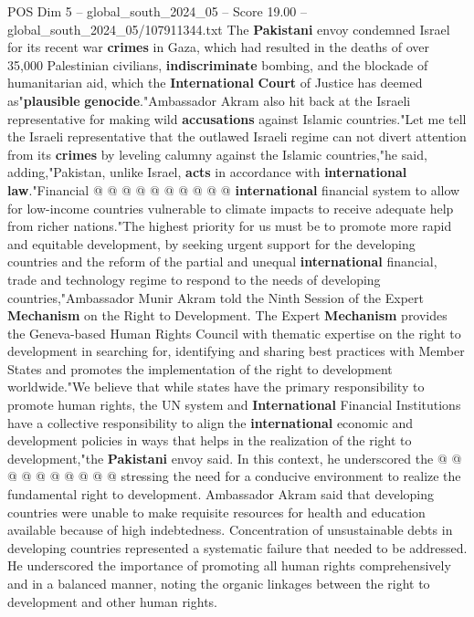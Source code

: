 \begin{textsample}{POS Dim 5 – global\_south\_2024\_05 – Score 19.00 – global\_south\_2024\_05/107911344.txt}
The \textbf{Pakistani} envoy condemned Israel for its recent war \textbf{crimes} in Gaza, which had resulted in the deaths of over 35,000 Palestinian civilians, \textbf{indiscriminate} bombing, and the blockade of humanitarian aid, which the \textbf{International} \textbf{Court} of Justice has deemed as"\textbf{plausible} \textbf{genocide}."Ambassador Akram also hit back at the Israeli representative for making wild \textbf{accusations} against Islamic countries."Let me tell the Israeli representative that the outlawed Israeli regime can not divert attention from its \textbf{crimes} by leveling calumny against the Islamic countries,"he said, adding,"Pakistan, unlike Israel, \textbf{acts} in accordance with \textbf{international} \textbf{law}."Financial @ @ @ @ @ @ @ @ @ @ \textbf{international} financial system to allow for low-income countries vulnerable to climate impacts to receive adequate help from richer nations."The highest priority for us must be to promote more rapid and equitable development, by seeking urgent support for the developing countries and the reform of the partial and unequal \textbf{international} financial, trade and technology regime to respond to the needs of developing countries,"Ambassador Munir Akram told the Ninth Session of the Expert \textbf{Mechanism} on the Right to Development.
The Expert \textbf{Mechanism} provides the Geneva-based Human Rights Council with thematic expertise on the right to development in searching for, identifying and sharing best practices with Member States and promotes the implementation of the right to development worldwide."We believe that while states have the primary responsibility to promote human rights, the UN system and \textbf{International} Financial Institutions have a collective responsibility to align the \textbf{international} economic and development policies in ways that helps in the realization of the right to development,"the \textbf{Pakistani} envoy said.
In this context, he underscored the @ @ @ @ @ @ @ @ @ @ stressing the need for a conducive environment to realize the fundamental right to development.
Ambassador Akram said that developing countries were unable to make requisite resources for health and education available because of high indebtedness.
Concentration of unsustainable debts in developing countries represented a systematic failure that needed to be addressed.
He underscored the importance of promoting all human rights comprehensively and in a balanced manner, noting the organic linkages between the right to development and other human rights.

\end{textsample}
